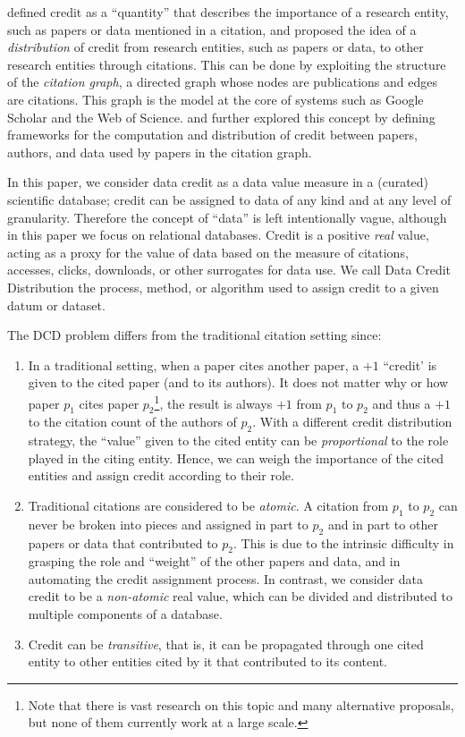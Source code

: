\cite{katz2020SoftwareandData}  defined credit as a ``quantity'' that describes the importance of a research entity, such as papers or data mentioned in a citation, and proposed the idea of a \emph{distribution} of credit from research entities, such as papers or data, to other research entities through citations. 
This can be done by exploiting the structure of the \emph{citation graph}, a directed graph whose nodes are publications and edges are citations.
This graph is the model at the core of systems such as Google Scholar and the Web of Science.
\citet{zeng2020assigning} and \citet{creditFang18} further explored this concept by defining frameworks for the  computation and distribution of credit between papers, authors, and data used by papers in the citation graph. 

In this paper, we consider data credit as a data value measure in a (curated) scientific database; credit can be assigned to data of any kind and at any level of granularity. Therefore the concept of ``data'' is left intentionally vague, although in this paper we focus on relational databases.
Credit is a positive \emph{real} value, acting as a proxy for the value of data based on the measure of citations, accesses, clicks, downloads, or other surrogates for data use. We call Data Credit Distribution the process, method, or algorithm used to assign credit to a given datum or dataset.

The DCD problem differs from the traditional citation setting since:
\begin{enumerate}
    \item In a traditional setting, when a paper cites another paper, a $+1$ ``credit' is given to the cited paper (and to its authors). It does not matter why or how paper $p_1$ cites paper $p_2$\footnote{Note that there is vast research on this topic and many alternative proposals, but none of them currently work at a large scale.}, the result is always $+1$ from $p_1$ to $p_2$ and thus a $+1$ to the citation count of the authors of $p_2$. With a different credit distribution strategy, the ``value'' given to the cited entity can be \emph{proportional} to the role played in the citing entity. Hence, we can weigh the importance of the cited entities and assign credit according to their role.
    \item Traditional citations are considered to be  \emph{atomic}. A citation from $p_1$ to $p_2$ can never be broken into pieces and assigned in part to $p_2$ and in part to other papers or data that contributed to $p_2$. This is due to the intrinsic difficulty in grasping the role and ``weight'' of the other papers and data, and in automating the credit assignment process.
	In contrast, we consider data credit to be a \emph{non-atomic} real value, which can be divided and distributed to multiple components of a database. 
	\item Credit can be \emph{transitive}, that is, it can be propagated through one cited entity to other entities cited by it that contributed to its content.
\end{enumerate}

